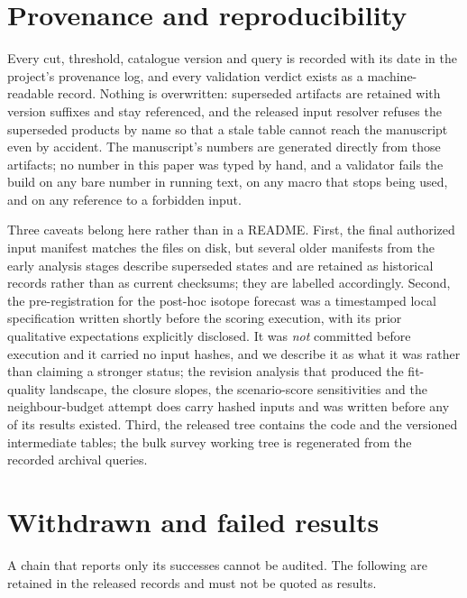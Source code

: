 \documentclass{aa}
\begin{document}
\section{Provenance and reproducibility}\label{app:provenance}

Every cut, threshold, catalogue version and query is recorded with its date in
the project's provenance log, and every validation verdict exists as a
machine-readable record. Nothing is overwritten: superseded artifacts are
retained with version suffixes and stay referenced, and the released input
resolver refuses the superseded products by name so that a stale table cannot
reach the manuscript even by accident. The manuscript's numbers are generated
directly from those artifacts; no number in this paper was typed by hand, and a
validator fails the build on any bare number in running text, on any macro that
stops being used, and on any reference to a forbidden input.

Three caveats belong here rather than in a README. First, the final authorized
input manifest matches the files on disk, but several older manifests from the
early analysis stages describe superseded states and are retained as historical
records rather than as current checksums; they are labelled accordingly. Second,
the pre-registration for the post-hoc isotope forecast was a timestamped local
specification written shortly before the scoring execution, with its prior
qualitative expectations explicitly disclosed. It was \emph{not} committed
before execution and it carried no input hashes, and we describe it as what it
was rather than claiming a stronger status; the revision analysis that produced
the fit-quality landscape, the closure slopes, the scenario-score sensitivities and the
neighbour-budget attempt does carry hashed inputs and was written before any of
its results existed. Third, the released tree contains the code and the
versioned intermediate tables; the bulk survey working tree is regenerated from
the recorded archival queries.

\section{Withdrawn and failed results}\label{app:withdrawn}

A chain that reports only its successes cannot be audited. The following are
retained in the released records and must not be quoted as results.
\end{document}
